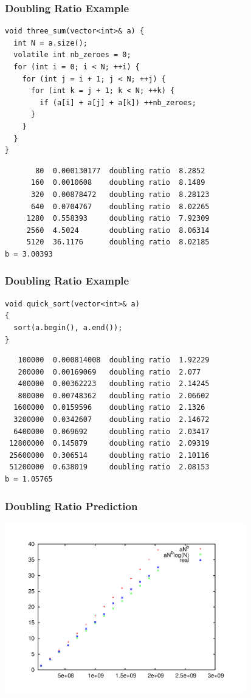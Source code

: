 \documentclass{beamer}
\begin{document}
\begin{frame}[containsverbatim]
\frametitle{Doubling Ratio Example}
\scriptsize
\begin{lstlisting}
void three_sum(vector<int>& a) {
  int N = a.size();
  volatile int nb_zeroes = 0;
  for (int i = 0; i < N; ++i) {
    for (int j = i + 1; j < N; ++j) {
      for (int k = j + 1; k < N; ++k) {
        if (a[i] + a[j] + a[k]) ++nb_zeroes;
      }
    }
  }
}
\end{lstlisting}

\begin{verbatim}
       80  0.000130177  doubling ratio  8.2852
      160  0.0010608    doubling ratio  8.1489
      320  0.00878472   doubling ratio  8.28123
      640  0.0704767    doubling ratio  8.02265
     1280  0.558393     doubling ratio  7.92309
     2560  4.5024       doubling ratio  8.06314
     5120  36.1176      doubling ratio  8.02185
b = 3.00393
\end{verbatim}

\end{frame}

\begin{frame}[containsverbatim]
\frametitle{Doubling Ratio Example}
\scriptsize
\begin{lstlisting}
void quick_sort(vector<int>& a)
{
  sort(a.begin(), a.end());
}
\end{lstlisting}

\begin{verbatim}
   100000  0.000814008  doubling ratio  1.92229
   200000  0.00169069   doubling ratio  2.077
   400000  0.00362223   doubling ratio  2.14245
   800000  0.00748362   doubling ratio  2.06602
  1600000  0.0159596    doubling ratio  2.1326
  3200000  0.0342607    doubling ratio  2.14672
  6400000  0.069692     doubling ratio  2.03417
 12800000  0.145879     doubling ratio  2.09319
 25600000  0.306514     doubling ratio  2.10116
 51200000  0.638019     doubling ratio  2.08153
b = 1.05765
\end{verbatim}

\end{frame}

\begin{frame}[containsverbatim]
\frametitle{Doubling Ratio Prediction}

\begin{center}
\includegraphics[width=10.5cm]{model.pdf}%
\end{center}

\end{frame}
\end{document}
